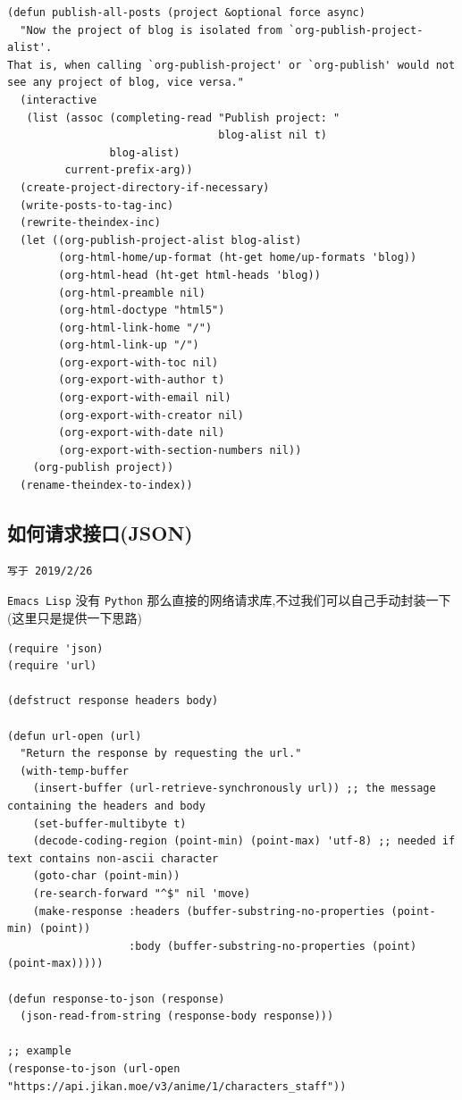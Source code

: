 \documentclass[11pt]{article}
\begin{document}
\begin{verbatim}
(defun publish-all-posts (project &optional force async)
  "Now the project of blog is isolated from `org-publish-project-alist'.
That is, when calling `org-publish-project' or `org-publish' would not
see any project of blog, vice versa."
  (interactive
   (list (assoc (completing-read "Publish project: "
                                 blog-alist nil t)
                blog-alist)
         current-prefix-arg))
  (create-project-directory-if-necessary)
  (write-posts-to-tag-inc)
  (rewrite-theindex-inc)
  (let ((org-publish-project-alist blog-alist)
        (org-html-home/up-format (ht-get home/up-formats 'blog))
        (org-html-head (ht-get html-heads 'blog))
        (org-html-preamble nil)
        (org-html-doctype "html5")
        (org-html-link-home "/")
        (org-html-link-up "/")
        (org-export-with-toc nil)
        (org-export-with-author t)
        (org-export-with-email nil)
        (org-export-with-creator nil)
        (org-export-with-date nil)
        (org-export-with-section-numbers nil))
    (org-publish project))
  (rename-theindex-to-index))
\end{verbatim}


\subsection{如何请求接口(JSON)}
\label{sec:orgc374eb7}
\begin{verbatim}
写于 2019/2/26
\end{verbatim}
\texttt{Emacs Lisp} 没有 \texttt{Python} 那么直接的网络请求库,不过我们可以自己手动封装一下(这里只是提供一下思路)

\begin{verbatim}
(require 'json)
(require 'url)

(defstruct response headers body)

(defun url-open (url)
  "Return the response by requesting the url."
  (with-temp-buffer
    (insert-buffer (url-retrieve-synchronously url)) ;; the message containing the headers and body
    (set-buffer-multibyte t)
    (decode-coding-region (point-min) (point-max) 'utf-8) ;; needed if text contains non-ascii character
    (goto-char (point-min))
    (re-search-forward "^$" nil 'move)
    (make-response :headers (buffer-substring-no-properties (point-min) (point))
                   :body (buffer-substring-no-properties (point) (point-max)))))

(defun response-to-json (response)
  (json-read-from-string (response-body response)))

;; example
(response-to-json (url-open "https://api.jikan.moe/v3/anime/1/characters_staff"))
\end{verbatim}
\end{document}

